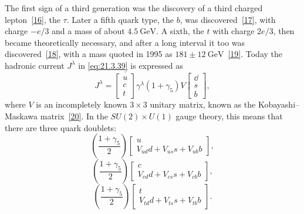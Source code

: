 The first sign of a third generation was the discovery of a third charged lepton~\hyperref[ch21-ref-16]{[16]}, the $\tau$. Later a fifth quark type, the $b$, was discovered~\hyperref[ch21-ref-17]{[17]}, with charge $-e/3$ and a mass of about $4.5\ \mathrm{GeV}$. A sixth, the $t$ with charge $2e/3$, then became theoretically necessary, and after a long interval it too was discovered~\hyperref[ch21-ref-18]{[18]}, with a mass quoted in 1995 as $181\mathbin{\pm}12\ \mathrm{GeV}$~\hyperref[ch21-ref-19]{[19]}. Today the hadronic current $J^\lambda$ in \eqref{eq:21.3.39} is expressed as
\begin{equation}
J^\lambda
=
\overline{\begin{bmatrix}u\\c\\t\end{bmatrix}}
\gamma^\lambda(1+\gamma_5)V
\begin{bmatrix}\dd\\s\\b\end{bmatrix},
\tag{21.3.45}\label{eq:21.3.45}
\end{equation}
where $V$ is an incompletely known $3\times3$ unitary matrix, known as the Kobayashi--Maskawa matrix~\hyperref[ch21-ref-20]{[20]}. In the $SU(2)\times U(1)$ gauge theory, this means that there are three quark doublets:
\begin{equation}
\left(\frac{1+\gamma_5}{2}\right)
\begin{bmatrix}
u\\
V_{ud}d+V_{us}s+V_{ub}b
\end{bmatrix},
\tag{21.3.46}\label{eq:21.3.46}
\end{equation}
\begin{equation}
\left(\frac{1+\gamma_5}{2}\right)
\begin{bmatrix}
c\\
V_{cd}d+V_{cs}s+V_{cb}b
\end{bmatrix},
\tag{21.3.47}\label{eq:21.3.47}
\end{equation}
\begin{equation}
\left(\frac{1+\gamma_5}{2}\right)
\begin{bmatrix}
t\\
V_{td}d+V_{ts}s+V_{tb}b
\end{bmatrix}.
\tag{21.3.48}\label{eq:21.3.48}
\end{equation}

